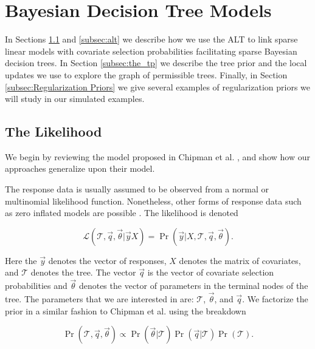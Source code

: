 \section{Bayesian Decision Tree Models}\label{sec:Model}

In Sections \ref{sec:lhood} and \ref{subsec:alt} we describe how we use the ALT to link sparse linear models with covariate selection probabilities facilitating sparse Bayesian decision trees. In Section \ref{subsec:the_tp} we describe the tree prior and the local updates we use to explore the graph of permissible trees. Finally, in Section \ref{subsec:Regularization Priors} we give several examples of regularization priors we will study in our simulated examples.

	\subsection{The Likelihood}\label{sec:lhood}

We begin by reviewing the model proposed in Chipman et al. \cite{chipman1998bayesian}, and show how our approaches generalize upon their model. 

The response data is usually assumed to be observed from a normal or multinomial likelihood function. Nonetheless, other forms of response data such as zero inflated models are possible \cite{Roberts:2014fk}. The likelihood is denoted 

\begin{equation}\label{eqn:cgm_likelihood}
\mathcal{L}(\mathcal{T}, \vec{q}, \vec{\theta} \vert \vec{y} X)=\Pr(\vec{y} \vert X, \mathcal{T}, \vec{q}, \vec{\theta}).
\end{equation} 
		
\noindent Here the $\vec{y}$ denotes the vector of responses, $X$ denotes the matrix of covariates, and $\mathcal{T}$ denotes the tree. The vector $\vec{q}$ is the vector of covariate selection probabilities and $\vec{\theta}$ denotes the vector of parameters in the terminal nodes of the tree. The parameters that we are interested in are: $\mathcal{T}$, $\vec{\theta}$, and $\vec{q}$. We factorize the prior in a similar fashion to Chipman et al. using the breakdown 

\begin{equation}\label{eqn:prior}
\Pr(\mathcal{T}, \vec{q}, \vec{\theta}) \propto \Pr(\vec{\theta} \vert \mathcal{T}) \Pr(\vec{q} \vert \mathcal{T})\Pr(\mathcal{T}).
\end{equation} 


